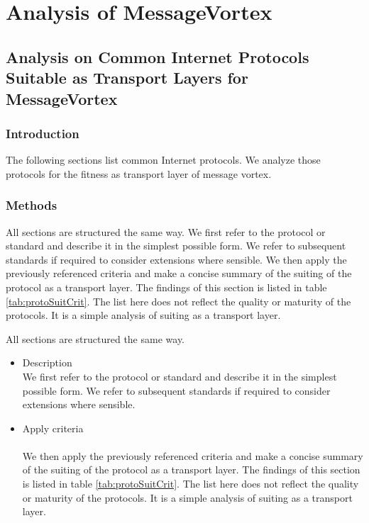 \part{Analysis of MessageVortex}
\chapter{Analysis on Common Internet Protocols Suitable as Transport Layers for MessageVortex\label{sec:transportProtocols}}

\section{Introduction}
The following sections list common Internet protocols. We analyze those protocols for the fitness as transport layer of message vortex. 

\section{Methods}

All sections are structured the same way. We first refer to the protocol or standard and describe it in the simplest possible form. We refer to subsequent standards if required to consider extensions where sensible. We then apply the previously referenced criteria and make a concise summary of the suiting of the protocol as a transport layer. The findings of this section is listed in table \ref{tab:protoSuitCrit}. The list here does not reflect the quality or maturity of the protocols. It is a simple analysis of suiting as a transport layer.

All sections are structured the same way. 
\begin{itemize}
	\item Description\\
	We first refer to the protocol or standard and describe it in the simplest possible form. We refer to subsequent standards if required to consider extensions where sensible.
	\item Apply criteria\\\\
	We then apply the previously referenced criteria and make a concise summary of the suiting of the protocol as a transport layer. The findings of this section is listed in table \ref{tab:protoSuitCrit}. The list here does not reflect the quality or maturity of the protocols. It is a simple analysis of suiting as a transport layer.
\end{itemize} 

